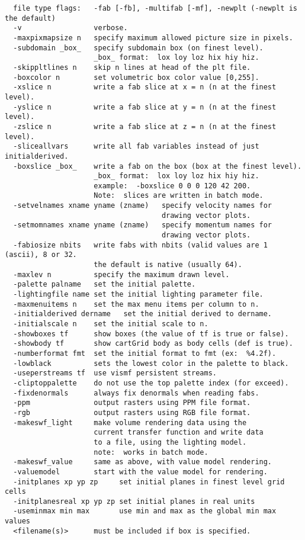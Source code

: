 \documentclass{article}
\begin{document}
\begin{verbatim}
  file type flags:   -fab [-fb], -multifab [-mf], -newplt (-newplt is the default)
  -v                 verbose.
  -maxpixmapsize n   specify maximum allowed picture size in pixels.
  -subdomain _box_   specify subdomain box (on finest level).
                     _box_ format:  lox loy loz hix hiy hiz.
  -skippltlines n    skip n lines at head of the plt file.
  -boxcolor n        set volumetric box color value [0,255].
  -xslice n          write a fab slice at x = n (n at the finest level).
  -yslice n          write a fab slice at y = n (n at the finest level).
  -zslice n          write a fab slice at z = n (n at the finest level).
  -sliceallvars      write all fab variables instead of just initialderived.
  -boxslice _box_    write a fab on the box (box at the finest level).
                     _box_ format:  lox loy loz hix hiy hiz.
                     example:  -boxslice 0 0 0 120 42 200.
                     Note:  slices are written in batch mode.
  -setvelnames xname yname (zname)   specify velocity names for
                                     drawing vector plots.
  -setmomnames xname yname (zname)   specify momentum names for
                                     drawing vector plots.
  -fabiosize nbits   write fabs with nbits (valid values are 1 (ascii), 8 or 32.
                     the default is native (usually 64).
  -maxlev n          specify the maximum drawn level.
  -palette palname   set the initial palette.
  -lightingfile name set the initial lighting parameter file.
  -maxmenuitems n    set the max menu items per column to n.
  -initialderived dername   set the initial derived to dername.
  -initialscale n    set the initial scale to n.
  -showboxes tf      show boxes (the value of tf is true or false).
  -showbody tf       show cartGrid body as body cells (def is true).
  -numberformat fmt  set the initial format to fmt (ex:  %4.2f).
  -lowblack          sets the lowest color in the palette to black.
  -useperstreams tf  use vismf persistent streams.
  -cliptoppalette    do not use the top palette index (for exceed).
  -fixdenormals      always fix denormals when reading fabs.
  -ppm               output rasters using PPM file format.
  -rgb               output rasters using RGB file format.
  -makeswf_light     make volume rendering data using the
                     current transfer function and write data
                     to a file, using the lighting model.
                     note:  works in batch mode.
  -makeswf_value     same as above, with value model rendering.
  -valuemodel        start with the value model for rendering.
  -initplanes xp yp zp     set initial planes in finest level grid cells
  -initplanesreal xp yp zp set initial planes in real units
  -useminmax min max       use min and max as the global min max values
  <filename(s)>      must be included if box is specified.
\end{verbatim}
\end{document}
